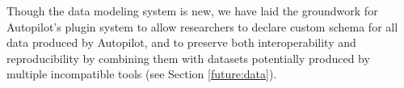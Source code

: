 Though the data modeling system is new, we have laid the groundwork for Autopilot's plugin system to allow researchers to declare custom schema for all data produced by Autopilot, and to preserve both interoperability and reproducibility by combining them with datasets potentially produced by multiple incompatible tools (see Section \ref{future:data}).



